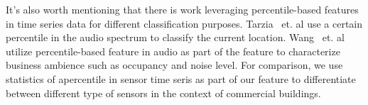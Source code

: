 It's also worth mentioning that there is work leveraging percentile-based features in time series data for different classification purposes. Tarzia~\cite{ABS} 
et. al use a certain percentile in the audio spectrum to classify the current location. Wang~\cite{business} et. al utilize percentile-based feature in audio as 
part of the feature to characterize business ambience such as occupancy and noise level. For comparison, we use statistics of apercentile in sensor time seris as 
part of our feature to differentiate between different type of sensors in the context of commercial buildings.
